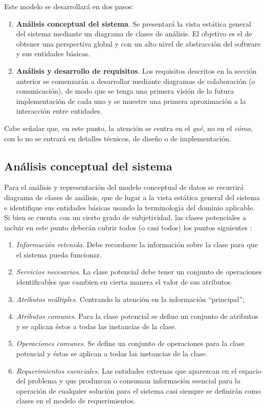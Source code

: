 Este modelo se desarrollará en dos pasos: 

\begin{enumerate}  
	\item \textbf{Análisis conceptual del sistema}. Se presentará la vista estática general del sistema mediante un diagrama de clases de análisis. El objetivo es el de obtener una perspectiva global y con un alto nivel de abstracción del software y sus entidades básicas.
	\item \textbf{Análisis y desarrollo de requisitos}. Los requisitos descritos en la sección anterior se comenzarán a desarrollar mediante diagramas de colaboración (o comunicación), de modo que se tenga una primera visión de la futura implementación de cada uno y se muestre una primera aproximación a la interacción entre entidades.
\end{enumerate}

Cabe señalar que, en este punto, la atención se centra en el \emph{qué}, no en el \emph{cómo}, con lo no se entrará en detalles técnicos, de diseño o de implementación.

\subsection{Análisis conceptual del sistema}

Para el análisis y representación del modelo conceptual de datos se recurrirá diagrama de clases de análisis, que de lugar a la vista estática general del sistema e identifique sus entidades básicas usando la terminología del dominio aplicable. Si bien se cuenta con un cierto grado de subjetividad, las clases potenciales a incluir en este punto deberán cubrir todos (o casi todos) los puntos siguientes \cite{Coa91}:

\begin{enumerate}  
	\item \textit{Información retenida}. Debe recordarse la información sobre la clase para que el sistema pueda funcionar.
	\item \textit{Servicios necesarios}. La clase potencial debe tener un conjunto de operaciones identificables que cambien en cierta manera el valor de sus atributos.
	\item \textit{Atributos múltiples}. Centrando la atención en la información ``principal'';
	\item \textit{Atributos comunes}. Para la clase potencial se define un conjunto de atributos y se aplican éstos a todas las instancias de la clase.
	\item \textit{Operaciones comunes}. Se define un conjunto de operaciones para la clase potencial y éstas se aplican a todas las instancias de la clase.
	\item \textit{Requerimientos esenciales}. Las entidades externas que aparezcan en el espacio del problema y que produzcan o consuman información esencial para la operación de cualquier solución para el sistema casi siempre se definirán como clases en el modelo de requerimientos.	
\end{enumerate}

